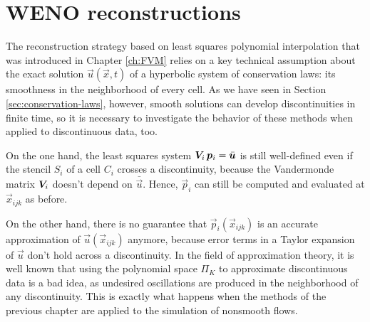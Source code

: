 \graphicspath{{./figures/chapter4/}}
\lstset{inputpath = ../MATLAB}

\chapter{WENO reconstructions} \label{ch:WENO}

The reconstruction strategy based on least squares polynomial interpolation
that was introduced in Chapter \ref{ch:FVM} relies on a key technical assumption
about the exact solution $\vec{u}(\vec{x},t)$ of a hyperbolic system
of conservation laws: its smoothness in the neighborhood of every cell.
As we have seen in Section \ref{sec:conservation-laws}, however,
smooth solutions can develop discontinuities in finite time,
so it is necessary to investigate the behavior of these methods
when applied to discontinuous data, too.

On the one hand, the least squares system $\bm{V}_i \, \bm{p}_i = \bar{\bm{u}}$
is still well-defined even if the stencil $S_i$ of a cell $C_i$ crosses
a discontinuity, because the Vandermonde matrix $\bm{V}_i$ doesn't depend
on $\bar{\vec{u}}$. Hence, $\vec{p}_i$ can still be computed and evaluated
at $\vec{x}_{ijk}$ as before.

On the other hand, there is no guarantee that $\vec{p}_i(\vec{x}_{ijk})$
is an accurate approximation of $\vec{u}(\vec{x}_{ijk})$ anymore,
because error terms in a Taylor expansion of $\vec{u}$ don't hold
across a discontinuity. In the field of approximation theory, it is
well known that using the polynomial space $\Pi_K$ to approximate discontinuous
data is a bad idea, as undesired oscillations are produced in the neighborhood
of any discontinuity. This is exactly what happens when the methods
of the previous chapter are applied to the simulation of nonsmooth flows.

